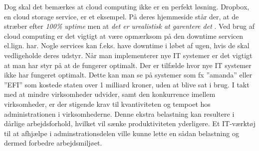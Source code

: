 Dog skal det bemærkes at cloud computing ikke er en perfekt løsning. Dropbox, en cloud storage service, er et eksempel. På deres hjemmeside står der, at de stræber efter \textit{100\% uptime} men at \textit{det er urealistisk at garentere det} \citep{drpbx_downtime}. Ved brug af cloud computing er det vigtigt at være opmærksom på den downtime servicen el.lign. har. Nogle services kan f.eks. have downtime i løbet af ugen, hvis de skal vedligeholde deres udstyr. Når man implementerer nye IT systemer er det vigtigt at man har styr på at de fungerer optimalt. Der er tilfælde hvor nye IT systemer ikke har fungeret optimalt. Dette kan man se på systemer som fx ”amanda” eller ”EFI” som kostede staten over 1 milliard kroner, uden at blive sat i brug\citep{DrItsys}. I takt med at mindre virksomheder udvider, samt den konkurrence imellem virksomheder, er der stigende krav til kvantiviteten og tempoet hos administrationen i virksomhederne. Denne ekstra belastning kan resultere i dårlige arbejdsforhold, hvilket vil sænke produktiviteten yderligere. Et IT-værktøj til at afhjælpe i adminstrationsdelen ville kunne lette en sådan belastning og dermed forbedre arbejdsmiljøet\citep{It_armil}. 



